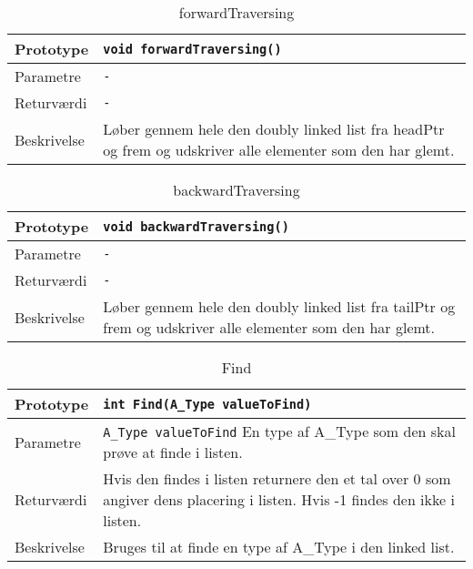 \begin{table}[h]
\begin{tabularx}{\textwidth}{| >{\raggedright\arraybackslash}p{2.5 cm} | >{\raggedright\arraybackslash}X |} \hline
Prototype & \texttt{void forwardTraversing()} \\\hline
Parametre & \texttt{-} \\\hline
Returværdi & \texttt{-} \\\hline
Beskrivelse & Løber gennem hele den doubly linked list fra headPtr og frem og udskriver alle elementer som den har glemt. \\\hline
\end{tabularx}
\caption{forwardTraversing}
\label{table:forwardTraversing}
\end{table}


\begin{table}[h]
\begin{tabularx}{\textwidth}{| >{\raggedright\arraybackslash}p{2.5 cm} | >{\raggedright\arraybackslash}X |} \hline
Prototype & \texttt{void backwardTraversing()} \\\hline
Parametre & \texttt{-} \\\hline
Returværdi & \texttt{-} \\\hline
Beskrivelse & Løber gennem hele den doubly linked list fra tailPtr og frem og udskriver alle elementer som den har glemt. \\\hline
\end{tabularx}
\caption{backwardTraversing}
\label{table:backwardTraversing}
\end{table}


\begin{table}[h]
\begin{tabularx}{\textwidth}{| >{\raggedright\arraybackslash}p{2.5 cm} | >{\raggedright\arraybackslash}X |} \hline
Prototype & \texttt{int Find(A\_Type valueToFind)} \\\hline
Parametre & \texttt{A\_Type valueToFind} \newline
En type af A\_Type som den skal prøve at finde i listen. \\\hline
Returværdi & Hvis den findes i listen returnere den et tal over 0 som angiver dens placering i listen. Hvis -1 findes den ikke i listen. \\\hline
Beskrivelse & Bruges til at finde en type af A\_Type i den linked list. \\\hline
\end{tabularx}
\caption{Find}
\label{table:Find}
\end{table}


